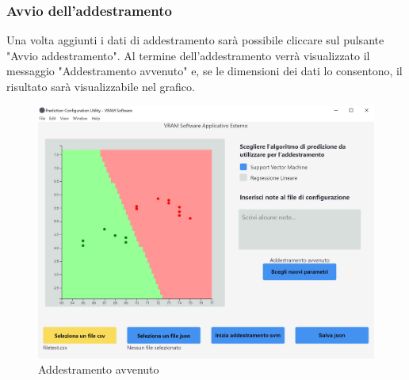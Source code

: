		\subsubsection{Avvio dell'addestramento}
		Una volta aggiunti i dati di addestramento sarà possibile cliccare sul pulsante "Avvio addestramento". Al termine dell'addestramento verrà visualizzato il messaggio "Addestramento avvenuto" e, se le dimensioni dei dati lo consentono, il risultato sarà visualizzabile nel grafico.
		\mbox{}
		\begin{figure} [H]
			\begin{center}
				\includegraphics[width=\linewidth]{./img/4.jpg}
			\end{center}
			\caption{Addestramento avvenuto}
		\end{figure}
		\mbox{}
